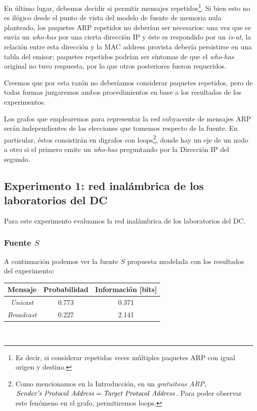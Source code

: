\par En último lugar, debemos decidir si permitir mensajes repetidos\footnote{Es decir, si considerar repetidas veces múltiples paquetes ARP con igual origen y destino.}. 
Si bien esto no es ilógico desde el punto de vista del modelo de fuente de memoria nula planteado, los paquetes ARP repetidos no deberían ser necesarios: una vez que se envía un \textit{who-has} por una cierta dirección IP y éste es respondido por un \textit{is-at}, la relación entre esta dirección y la MAC address provista debería persistirse en una tabla del emisor; paquetes repetidos podrían ser síntomas de que el \textit{who-has} original no tuvo respuesta, por lo que otros posteriores fueron requeridos.

\par Creemos que por esta razón no deberíamos considerar paquetes repetidos, pero de todas formas juzgaremos ambos procedimientos en base a los resultados de los experimentos.

\par Los grafos que emplearemos para representar la red subyacente de mensajes ARP serán independientes de las elecciones que tomemos respecto de la fuente.
En particular, éstos consistirán en digrafos con loops\footnote{Como mencionamos en la Introducción, en un \textit{gratuitous ARP}, $\text{\textit{Sender's Protocol Address}} = \text{\textit{Target Protocol Address}}$. Para poder observar este fenómeno en el grafo, permitiremos loops.}, donde hay un eje de un nodo a otro si el primero emite un \textit{who-has} preguntando por la Dirección IP del segundo. 

\subsection{Experimento 1: red inalámbrica de los laboratorios del DC}

\par Para este experimento evaluamos la red inalámbrica de los laboratorios del DC.

\subsubsection{Fuente $S$}

\par A continuación podemos ver la fuente $S$ propuesta modelada con los resultados del experimento: \\

\begin{tabular}{ | c | c | c |}
    \hline
    Mensaje & Probabilidad & Información [bits] \\
    \hline
    \textit{Unicast} & 0.773 & 0.371 \\
    \hline
    \textit{Broadcast} & 0.227 & 2.141 \\
    \hline
\end{tabular} \\

